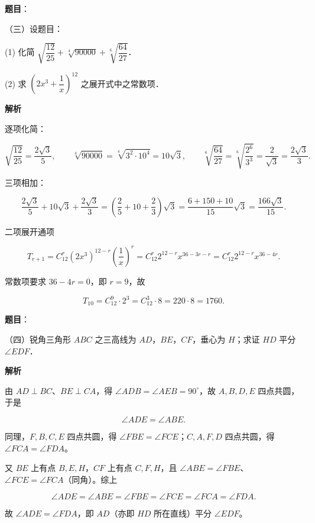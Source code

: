 \begin{answer}

\textbf{题目}：

（三）设题目：

  (1) 化简 $\sqrt{\dfrac{12}{25}}+\sqrt[4]{90000}+\sqrt[6]{\dfrac{64}{27}}$．

  (2) 求 $\left(2x^3+\dfrac1x\right)^{12}$ 之展开式中之常数项．

\textbf{解析}


逐项化简：

\nopagebreak[4]
\[
\sqrt{\frac{12}{25}}=\frac{2\sqrt3}{5},\qquad
\sqrt[4]{90000}=\sqrt[4]{3^2\cdot10^4}=10\sqrt3,\qquad
\sqrt[6]{\frac{64}{27}}=\sqrt[6]{\frac{2^6}{3^3}}=\frac{2}{\sqrt3}=\frac{2\sqrt3}{3}.
\]

三项相加：

\nopagebreak[4]
\[
\frac{2\sqrt3}{5}+10\sqrt3+\frac{2\sqrt3}{3}
=\left(\frac25+10+\frac23\right)\sqrt3
=\frac{6+150+10}{15}\sqrt3
=\frac{166\sqrt3}{15}.
\]


二项展开通项

\nopagebreak[4]
\[
T_{r+1}=C_{12}^r(2x^3)^{12-r}\left(\frac1x\right)^r
=C_{12}^r2^{12-r}x^{36-3r-r}
=C_{12}^r2^{12-r}x^{36-4r}.
\]

常数项要求 $36-4r=0$，即 $r=9$，故

\nopagebreak[4]
\[
T_{10}=C_{12}^9\cdot2^3=C_{12}^3\cdot8=220\cdot8=1760.
\]



\end{answer}
\begin{answer}

\textbf{题目}：

（四）锐角三角形 $ABC$ 之三高线为 $AD$，$BE$，$CF$，垂心为 $H$；求证 $HD$ 平分 $\angle EDF$．

\textbf{解析}

由 $AD\perp BC$、$BE\perp CA$，得 $\angle ADB=\angle AEB=90^\circ$，故 $A,B,D,E$ 四点共圆，于是

\nopagebreak[4]
\[
\angle ADE=\angle ABE.
\]

同理，$F,B,C,E$ 四点共圆，得 $\angle FBE=\angle FCE$；$C,A,F,D$ 四点共圆，得 $\angle FCA=\angle FDA$。

又 $BE$ 上有点 $B,E,H$，$CF$ 上有点 $C,F,H$，且 $\angle ABE=\angle FBE$、$\angle FCE=\angle FCA$（同角）。综上

\nopagebreak[4]
\[
\angle ADE=\angle ABE=\angle FBE=\angle FCE=\angle FCA=\angle FDA.
\]

故 $\angle ADE=\angle FDA$，即 $AD$（亦即 $HD$ 所在直线）平分 $\angle EDF$。


\end{answer}

